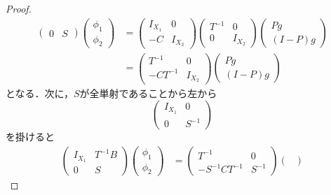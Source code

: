 \begin{proof}
\begin{equation}
\begin{split}
\begin{pmatrix}
        0 & S
      \end{pmatrix}
      \begin{pmatrix}
        \phi_1 \\
        \phi_2
      \end{pmatrix}
      &=
      \begin{pmatrix}
        I_{X_1} & 0 \\
        -C & I_{X_2}
      \end{pmatrix}
      \begin{pmatrix}
        T^{-1} & 0 \\
        0 & I_{X_2}
      \end{pmatrix}
      \begin{pmatrix}
        Pg \\
        (I-P)g
      \end{pmatrix}\\
      &=
      \begin{pmatrix}
        T^{-1} & 0 \\
        -CT^{-1} & I_{X_2}
      \end{pmatrix}
      \begin{pmatrix}
        Pg \\
        (I-P)g
      \end{pmatrix}
    \end{split}
  \end{equation}
  となる．次に，$S$が全単射であることから左から
  \begin{equation*}
    \begin{pmatrix}
      I_{X_1} & 0 \\
      0 & S^{-1}
    \end{pmatrix}
  \end{equation*}
  を掛けると
  \begin{equation*}
    \begin{split}
      \begin{pmatrix}
        I_{X_1} & T^{-1}B \\
        0 & S
      \end{pmatrix}
      \begin{pmatrix}
        \phi_1 \\
        \phi_2
      \end{pmatrix}
      &=
      \begin{pmatrix}
        T^{-1} & 0 \\
        -S^{-1}CT^{-1} & S^{-1}
      \end{pmatrix}
      \begin{pmatrix}

\end{pmatrix}
\end{split}
\end{equation*}
\end{proof}
